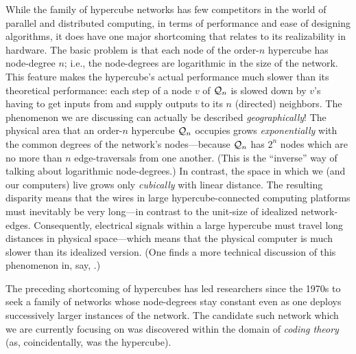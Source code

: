 While the family of hypercube networks has few competitors in the
world of parallel and distributed computing, in terms of performance
and ease of designing algorithms, it does have one major shortcoming
that relates to its realizability in hardware.  The basic problem is that each node of the
order-$n$ hypercube has node-degree $n$; i.e., the node-degrees are logarithmic
in the size of the network.  This feature makes the hypercube's actual
performance much slower than its theoretical performance: each step of a node $v$ of $\mbox{$\cal Q$}_n$ is slowed down by $v$'s having
to get inputs from and supply outputs to its $n$ (directed) neighbors.  The phenomenon we are discussing can actually
be described {\em geographically}!  The physical area that an order-$n$ hypercube $\mbox{$\cal Q$}_n$ occupies grows
{\em exponentially} with the
common degrees of the network's nodes---because $\mbox{$\cal Q$}_n$ has $2^n$ nodes which are no more than $n$ 
edge-traversals from one another.  (This is the ``inverse'' way
of talking about logarithmic node-degrees.)  In contrast, the space in which we (and our computers) live grows only 
{\em cubically} with linear distance.  The resulting disparity means that the wires in large hypercube-connected
computing platforms must inevitably be very long---in contrast to the unit-size
of idealized network-edges.  Consequently, electrical signals within a
large hypercube must travel long distances in physical space---which means that the
physical computer is much slower than its idealized version.  (One
finds a more technical discussion of this phenomenon in, say, \cite{Ullman84}.)

The preceding shortcoming of hypercubes has led researchers since the 1970s to seek a
family of networks whose node-degrees stay constant even as one
deploys successively larger instances of the network.  The candidate
such network which we are currently focusing on was discovered within the domain of {\it coding theory} (as,
coincidentally, was the hypercube).  

